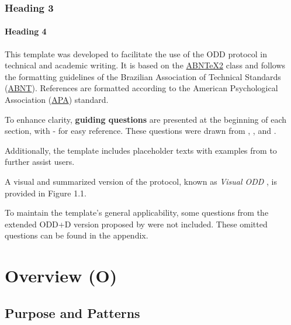 \subsection{Heading 3}

\subsubsection{Heading 4}


This template was developed to facilitate the use of the ODD protocol in technical and academic writing. It is based on the \href{https://github.com/abntex/abntex2}{ABNTeX2} class and follows the formatting guidelines of the Brazilian Association of Technical Standards (\href{https://www.abnt.org.br/}{ABNT}). References are formatted according to the American Psychological Association (\href{https://apastyle.apa.org/}{APA}) standard.

To enhance clarity, \textbf{guiding questions} are presented at the beginning of each section, with - for easy reference. These questions were drawn from \autocite{grimm2020}, \autocite{grimm2010}, and \autocite{railsback2019a}.

Additionally, the template includes placeholder texts with examples from \autocite{grimm2020} to further assist users.

A visual and summarized version of the protocol, known as \textit{Visual ODD} \autocite{szangolies2024}, is provided in Figure 1.1.

To maintain the template's general applicability, some questions from the extended ODD+D version proposed by \autocite{muller2013} were not included. These omitted questions can be found in the appendix.


\chapter{Overview (O)}

\section{Purpose and Patterns}

\begin{tcolorbox}
  \begin{tcbitemize}
    \item[\gdred{\arrowbullet}] 
    \item[\gdblue{\arrowbullet}] 
    \item[\gdgreen{\arrowbullet}] 
  \end{tcbitemize}
\end{tcolorbox}

